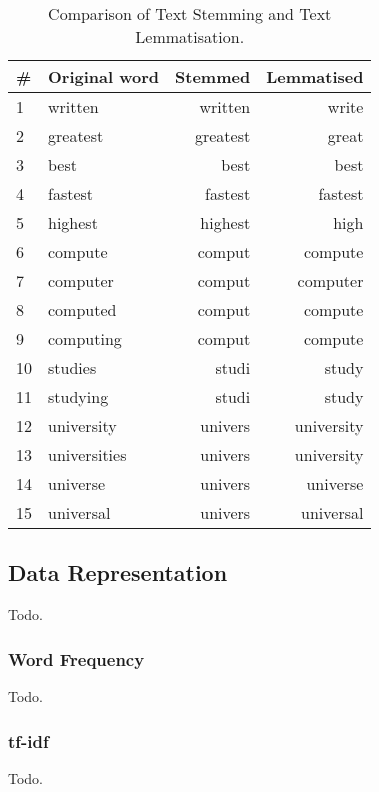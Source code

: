 \begin{table}[h]
    \centering
    \begin{tabular}{|l|l|r|r|}
    \hline
    \textbf{\#} & \textbf{Original word} & \textbf{Stemmed} & \textbf{Lemmatised} \\ \hline
    1 & written & written & write \\ \hline
    2 & greatest & greatest & great \\ \hline
    3 & best & best & best \\ \hline
    4 & fastest & fastest & fastest \\ \hline
    5 & highest & highest & high \\ \hline
    6 & compute & comput & compute \\ \hline
    7 & computer & comput & computer \\ \hline
    8 & computed & comput & compute \\ \hline
    9 & computing & comput & compute \\ \hline
    10 & studies & studi & study \\ \hline
    11 & studying & studi & study \\ \hline
    12 & university & univers & university \\ \hline
    13 & universities & univers & university \\ \hline
    14 & universe & univers & universe \\ \hline
    15 & universal & univers & universal \\ \hline
    \end{tabular}
    \caption{Comparison of Text Stemming and Text Lemmatisation.}
    \label{tab:comparison_stemming_lemmatisation}
\end{table}


\subsection{Data Representation}
Todo.

\subsubsection{Word Frequency}
Todo.

\subsubsection{tf-idf}
Todo.

